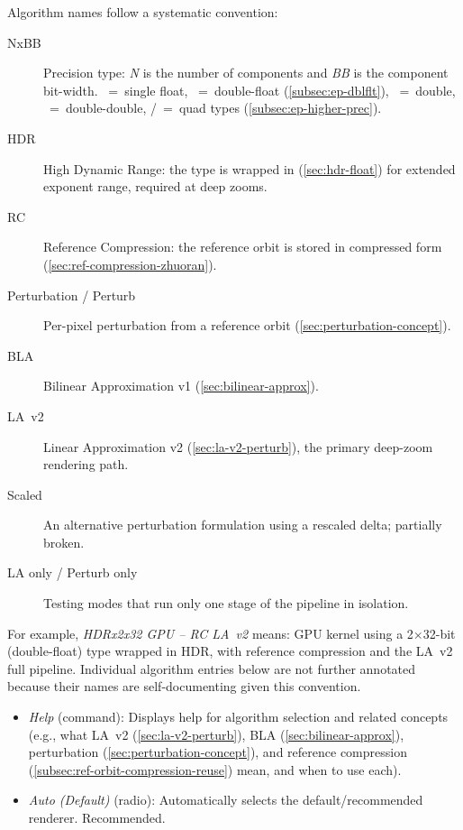 \begin{itemize}
  Algorithm names follow a systematic convention:
  \begin{description}
    \item[\textrm{N}x\textrm{BB}] Precision type: \emph{N} is the number of
    components and \emph{BB} is the component bit-width.
    ~=~single float, ~=~double-float
    (\cref{subsec:ep-dblflt}), ~=~double,
    ~=~double-double, /~=~quad
    types (\cref{subsec:ep-higher-prec}).
    \item[HDR] High Dynamic Range: the type is wrapped in
     (\cref{sec:hdr-float}) for extended exponent range,
    required at deep zooms.
    \item[RC] Reference Compression: the reference orbit is stored in
    compressed form (\cref{sec:ref-compression-zhuoran}).
    \item[Perturbation / Perturb] Per-pixel perturbation from a
    reference orbit (\cref{sec:perturbation-concept}).
    \item[BLA] Bilinear Approximation v1 (\cref{sec:bilinear-approx}).
    \item[LA~v2] Linear Approximation v2 (\cref{sec:la-v2-perturb}),
    the primary deep-zoom rendering path.
    \item[Scaled] An alternative perturbation formulation using a
    rescaled delta; partially broken.
    \item[LA only / Perturb only] Testing modes that run only one
    stage of the pipeline in isolation.
  \end{description}
  For example, \emph{HDRx2x32 GPU -- RC LA~v2} means: GPU kernel using
  a 2$\times$32-bit (double-float) type wrapped in HDR, with reference
  compression and the LA~v2 full pipeline.  Individual algorithm entries
  below are not further annotated because their names are
  self-documenting given this convention.

    \begin{itemize}
      \item \emph{Help} (command): Displays help for algorithm selection and
      related concepts (e.g., what LA~v2 (\cref{sec:la-v2-perturb}), BLA
      (\cref{sec:bilinear-approx}), perturbation (\cref{sec:perturbation-concept}),
      and reference compression (\cref{subsec:ref-orbit-compression-reuse}) mean,
      and when to use each).

      \item \emph{Auto (Default)} (radio): Automatically selects the
      default/recommended renderer.  Recommended.


\end{itemize}
\end{itemize}
